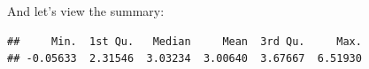 And let's view the summary:
\begin{knitrout}
\color{fgcolor}\begin{kframe}
\begin{alltt}
\end{alltt}
\begin{verbatim}
##     Min.  1st Qu.   Median     Mean  3rd Qu.     Max. 
## -0.05633  2.31546  3.03234  3.00640  3.67667  6.51930
\end{verbatim}
\end{kframe}
\end{knitrout}

